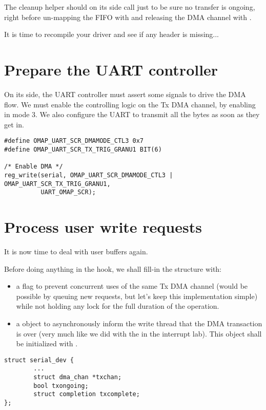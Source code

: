 The cleanup helper should on its side call
 just to be sure no transfer is
ongoing, right before un-mapping the FIFO with  and
releasing the DMA channel with .

It is time to recompile your driver and see if any header is missing...

\section{Prepare the UART controller}

On its side, the UART controller must assert some signals to drive the DMA
flow. We must enable the controlling logic on the Tx DMA channel, by enabling
 in mode 3. We also configure the UART to transmit all the bytes
as soon as they get in.

\begin{verbatim}
#define OMAP_UART_SCR_DMAMODE_CTL3 0x7
#define OMAP_UART_SCR_TX_TRIG_GRANU1 BIT(6)

/* Enable DMA */
reg_write(serial, OMAP_UART_SCR_DMAMODE_CTL3 | OMAP_UART_SCR_TX_TRIG_GRANU1,
          UART_OMAP_SCR);
\end{verbatim}

\section{Process user write requests}

It is now time to deal with user buffers again.

Before doing anything in the  hook, we shall fill-in the
 structure with:
\begin{itemize}
\item a  flag to prevent concurrent uses of the same
  Tx DMA channel (would be possible by queuing new requests, but let's keep this
  implementation simple) while not holding any lock for the full duration of
  the operation.
\item a  object to asynchronously inform the
  write thread that the DMA transaction is over (very much like we did with the
   in the interrupt lab). This object shall be initialized with
  .
\end{itemize}

\begin{verbatim}
struct serial_dev {
        ...
        struct dma_chan *txchan;
        bool txongoing;
        struct completion txcomplete;
};
\end{verbatim}

